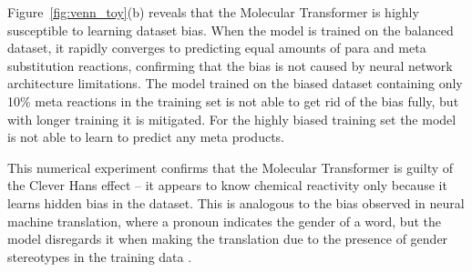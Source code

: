 



Figure~\ref{fig:venn_toy}(b) reveals that the Molecular Transformer is highly susceptible to learning dataset bias. When the model is trained on the balanced dataset, it rapidly converges to predicting equal amounts of para and meta substitution reactions, confirming that the bias is not caused by neural network architecture limitations. The model trained on the biased dataset containing only 10\% meta reactions in the training set is not able to get rid of the bias fully, but with longer training it is mitigated. For the highly biased training set the model is not able to learn to predict any meta products.

This numerical experiment confirms that the Molecular Transformer is guilty of the Clever Hans effect -- it appears to know chemical reactivity only because it learns hidden bias in the dataset. This is analogous to the bias observed in neural machine translation, where a pronoun indicates the gender of a word, but the model disregards it when making the translation due to the presence of gender stereotypes in the training data \cite{Stanovsky2019GenderBias}.

